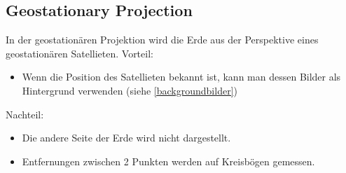 \subsection{Geostationary Projection}
\label{sec:geostat}
In der geostationären Projektion wird die Erde aus der Perspektive eines geostationären Satellieten.
Vorteil:\newline \begin{itemize}
                  \item Wenn die Position des Satellieten bekannt ist, kann man dessen
                  Bilder als Hintergrund verwenden (siehe \ref{backgroundbilder})
                 \end{itemize}

Nachteil:\newline \begin{itemize}
                  \item Die andere Seite der Erde wird nicht dargestellt.\\
                  \item Entfernungen zwischen 2 Punkten werden auf Kreisbögen gemessen.
                 \end{itemize}

